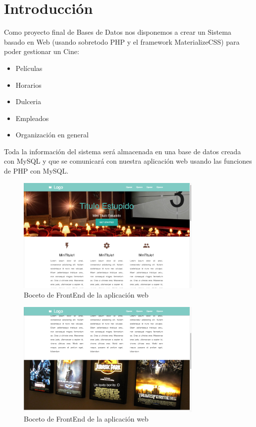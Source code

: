 \documentclass[11pt, fleqn]{article}                             %
\begin{document}
\section{Introducción}




    Como proyecto final de Bases de Datos nos disponemos a crear un Sistema basado en Web 
    (usando sobretodo PHP y el framework MaterializeCSS) para poder gestionar un Cine:
    \begin{itemize}
        \item Películas
        \item Horarios
        \item Dulceria
        \item Empleados
        \item Organización en general
    \end{itemize}


    Toda la información del sistema será almacenada en una base de datos creada con MySQL
    y que se comunicará con nuestra aplicación web usando las funciones de PHP con MySQL.

    \clearpage

    \begin{figure}[h!]
        \centering
        \includegraphics[width=0.80\textwidth]{Examples0.png}
        \caption{Boceto de FrontEnd de la aplicación web}
    \end{figure}

    \begin{figure}[h!]
        \centering
        \includegraphics[width=0.80\textwidth]{Examples1.png}
        \caption{Boceto de FrontEnd de la aplicación web}
    \end{figure}
\end{document}
